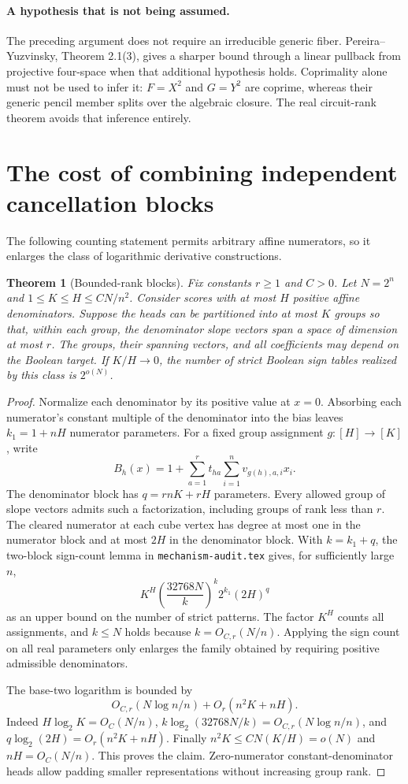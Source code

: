 \documentclass[11pt]{article}
\newtheorem{theorem}{Theorem}
\begin{document}
\paragraph{A hypothesis that is not being assumed.}
The preceding argument does not require an irreducible generic fiber.
Pereira--Yuzvinsky, Theorem 2.1(3), gives a sharper bound through a
linear pullback from projective four-space when that additional
hypothesis holds. Coprimality alone must not be used to infer it:
$F=X^2$ and $G=Y^2$ are coprime, whereas their generic pencil member
splits over the algebraic closure. The real circuit-rank theorem
avoids that inference entirely.

\section{The cost of combining independent cancellation blocks}

The following counting statement permits arbitrary affine numerators,
so it enlarges the class of logarithmic derivative constructions.

\begin{theorem}[Bounded-rank blocks]
Fix constants $r\ge1$ and $C>0$. Let $N=2^n$ and
$1\le K\le H\le CN/n^2$. Consider scores with at most $H$ positive
affine denominators. Suppose the heads can be partitioned into at most
$K$ groups so that, within each group, the denominator slope vectors
span a space of dimension at most $r$. The groups, their spanning
vectors, and all coefficients may depend on the Boolean target.
If $K/H\to0$, the number of strict Boolean sign tables realized by
this class is $2^{o(N)}$.
\end{theorem}
\begin{proof}
Normalize each denominator by its positive value at $x=0$. Absorbing
each numerator's constant multiple of the denominator into the bias
leaves $k_1=1+nH$ numerator parameters. For a fixed group assignment
$g:[H]\to[K]$, write
\[
 B_h(x)=1+\sum_{a=1}^r t_{ha}\sum_{i=1}^n v_{g(h),a,i}x_i.
\]
The denominator block has $q=rnK+rH$ parameters. Every allowed
group of slope vectors admits such a factorization, including groups
of rank less than $r$. The cleared numerator at each cube vertex has
degree at most one in the numerator block and at most $2H$ in the
denominator block. With $k=k_1+q$, the two-block sign-count lemma
in \texttt{mechanism-audit.tex} gives, for sufficiently large $n$,
\[
 K^H\left(\frac{32768N}{k}\right)^k2^{k_1}(2H)^q
\]
as an upper bound on the number of strict patterns. The factor $K^H$
counts all assignments, and $k\le N$ holds because
$k=O_{C,r}(N/n)$. Applying the sign count on all real parameters only
enlarges the family obtained by requiring positive admissible
denominators.

The base-two logarithm is bounded by
\[
 O_{C,r}(N\log n/n)+O_r(n^2K+nH).
\]
Indeed $H\log_2 K=O_C(N/n)$,
$k\log_2(32768N/k)=O_{C,r}(N\log n/n)$, and
$q\log_2(2H)=O_r(n^2K+nH)$.
Finally $n^2K\le CN(K/H)=o(N)$ and $nH=O_C(N/n)$.
This proves the claim. Zero-numerator constant-denominator heads
allow padding smaller representations without increasing group rank.
\end{proof}
\end{document}
